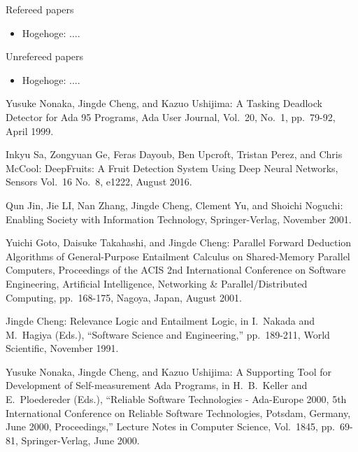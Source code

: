 \documentclass[12pt,epsf]{report}
\begin{document}
{{{{\begin{list}%
 {} %
 {} %
 \item Refereed papers
       \begin{itemize}
	\item Hogehoge: ....
       \end{itemize}
 \item Unrefereed papers
       \begin{itemize}
	\item Hogehoge: ....
       \end{itemize}
\end{list}

\newpage

%
%

\begin{thebibliography}{99}

Yusuke Nonaka, Jingde Cheng, and Kazuo Ushijima: A Tasking Deadlock
        Detector for Ada 95 Programs, Ada User Journal, Vol.\ 20, No.\ 1,
        pp.\ 79-92, April 1999.

        Inkyu Sa, Zongyuan Ge, Feras Dayoub, Ben Upcroft, Tristan Perez, and Chris McCool: DeepFruits: A Fruit Detection System Using Deep Neural Networks, Sensors Vol.\ 16 No.\ 8, e1222, August 2016.

Qun Jin, Jie LI, Nan Zhang, Jingde Cheng, Clement Yu, and Shoichi
        Noguchi: Enabling Society with Information Technology,
        Springer-Verlag, November 2001.

Yuichi Goto, Daisuke Takahashi, and Jingde Cheng: Parallel Forward
        Deduction Algorithms of General-Purpose Entailment Calculus on
        Shared-Memory Parallel Computers, Proceedings of the ACIS 2nd
        International Conference on Software Engineering, Artificial
        Intelligence, Networking \& Parallel/Distributed Computing,
        pp.\ 168-175, Nagoya, Japan, August 2001.

Jingde Cheng: Relevance Logic and Entailment Logic, in I.\ Nakada and
        M.\ Hagiya (Eds.), ``Software Science and Engineering,''
        pp.\ 189-211, World Scientific, November 1991.

Yusuke Nonaka, Jingde Cheng, and Kazuo Ushijima: A Supporting Tool for
        Development of Self-measurement Ada Programs, in H.\ B.\ Keller
        and E.\ Ploedereder (Eds.), ``Reliable Software Technologies -
        Ada-Europe 2000, 5th International Conference on Reliable
        Software Technologies, Potsdam, Germany, June 2000,
        Proceedings,'' Lecture Notes in Computer Science, Vol.\ 1845,
        pp.\ 69-81, Springer-Verlag, June 2000.



\end{thebibliography}}}}}
\end{document}
